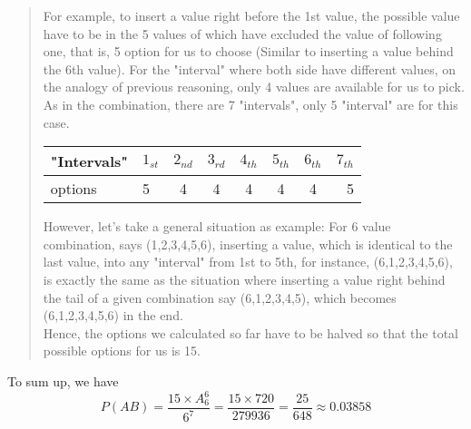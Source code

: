 \documentclass[11pt]{article}
\begin{document}
\begin{quote}
For example, to insert a value right before the 1st value, the possible
value have to be in the 5 values of which have excluded the value of
following one, that is, 5 option for us to choose (Similar to inserting
a value behind the 6th value). For the "interval" where both side have
different values, on the analogy of previous reasoning, only 4 values
are available for us to pick. As in the combination, there are 7
"intervals", only 5 "interval" are for this case.

\begin{longtable}[]{@{}llcccccr@{}}
\toprule
"Intervals" & \({1}_{st}\) & \({2}_{nd}\) & \({3}_{rd}\) & \({4}_{th}\)
& \({5}_{th}\) & \({6}_{th}\) & \({7}_{th}\)\tabularnewline
\midrule
\endhead
options & 5 & 4 & 4 & 4 & 4 & 4 & 5\tabularnewline
\bottomrule
\end{longtable}

However, let's take a general situation as example: For 6 value
combination, says (1,2,3,4,5,6), inserting a value, which is identical
to the last value, into any "interval" from 1st to 5th, for instance,
(6,1,2,3,4,5,6), is exactly the same as the situation where inserting a
value right behind the tail of a given combination say (6,1,2,3,4,5),
which becomes (6,1,2,3,4,5,6) in the end.\\
Hence, the options we calculated so far have to be halved so that the
total possible options for us is 15.
\end{quote}

To sum up, we have
\[P(AB)=\frac { 15\times { A }_{ 6 }^{ 6 } }{ { 6 }^{ 7 } } =\frac { 15\times 720 }{ 279936 } =\frac { 25 }{ 648 }\approx 0.03858 \]
\end{document}
